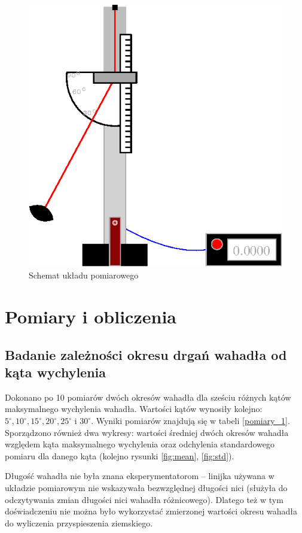 \documentclass[a4paper]{article}
\newlength{\du}
\begin{document}
\begin{figure}[h]
\centering
\includegraphics[scale=1]{uklad.eps}
\caption{Schemat układu pomiarowego}
\label{uklad_pomiarowy}
\end{figure}


\section{Pomiary i obliczenia}
\subsection{Badanie zależności okresu drgań wahadła od kąta wychylenia}

Dokonano po 10 pomiarów dwóch okresów wahadła dla sześciu różnych kątów maksymalnego wychylenia wahadła. 
Wartości kątów wynosiły kolejno:
$5^\circ, 10^\circ, 15^\circ, 20^\circ, 25^\circ$ i $30^\circ$. 
Wyniki pomiarów znajdują się w tabeli \ref{pomiary_1}. Sporządzono również dwa wykresy: 
wartości średniej dwóch okresów wahadła względem kąta maksymalnego wychylenia oraz 
odchylenia standardowego pomiaru dla danego kąta (kolejno rysunki \ref{fig:mean}, \ref{fig:std}).

Długość wahadła nie była znana eksperymentatorom -- linijka używana w układzie pomiarowym
nie wskazywała bezwzględnej długości nici (służyła do odczytywania zmian długości nici wahadła różnicowego). 
Dlatego też w tym doświadczeniu nie można było wykorzystać zmierzonej wartości okresu
wahadła do wyliczenia przyspieszenia ziemskiego.
\end{document}
